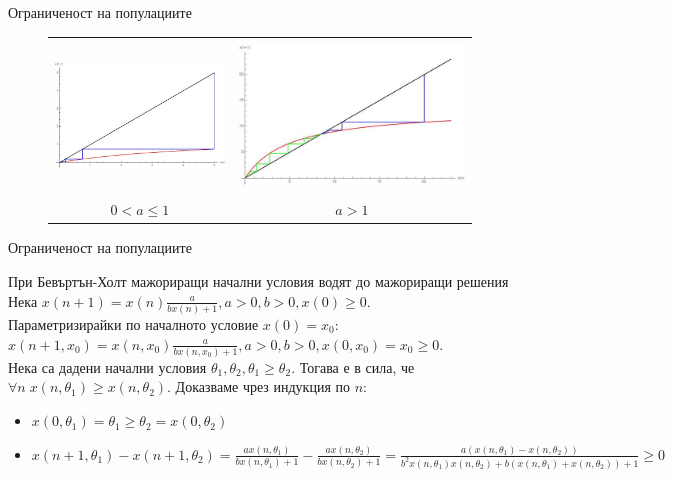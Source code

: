 \begin{frame}[t]{Ограниченост на популациите}

  \begin{center}

    \begin{figure}
      \begin{tabular}{c c}
        \includegraphics[width=4.5cm,height=4cm]{climbing1} &
        \includegraphics[width=6cm,height=4cm]{climbing2} \\
        {$0 < a \leq 1$} & {$a > 1$} \\
      \end{tabular}
    \end{figure}

  \end{center}

\end{frame}

\begin{frame}[t]{Ограниченост на популациите}

  \begin{block}{При Бевъртън-Холт мажориращи начални условия водят до мажориращи решения}
    Нека $x(n+1)=x(n)\frac{a}{b x(n) + 1}, a > 0, b > 0,x(0) \geq 0$. \\
    Параметризирайки по началното условие $x(0) = x_{0}$: \\
    $x(n+1,x_{0})= x(n,x_{0})\frac{a}{b x(n,x_{0}) + 1}, a > 0, b > 0,x(0, x_{0}) = x_{0} \geq 0$. \\
    Нека са дадени начални условия $\theta_{1}, \theta_{2}, \theta_{1} \geq \theta_{2}$. Тогава е в сила, че $\forall{n} \; x(n,\theta_{1}) \geq x(n,\theta_{2})$. Доказваме чрез индукция по $n$:
    \begin{itemize}
      \item $x(0, \theta_{1}) = \theta_{1} \geq \theta_{2} = x(0, \theta_{2})$
      \item $x(n+1, \theta_{1}) - x(n+1, \theta_{2}) =\frac{a x(n,\theta_{1})}{b x(n,\theta_{1}) + 1} - \frac{a x(n,\theta_{2})}{b x(n,\theta_{2}) + 1} = \frac{a (x(n,\theta_{1}) - x(n,\theta_{2}))}{b^{2} x(n,\theta_{1}) x(n,\theta_{2}) + b(x(n,\theta_{1}) + x(n,\theta_{2})) + 1} \geq 0$
    \end{itemize}

  \end{block}

\end{frame}

